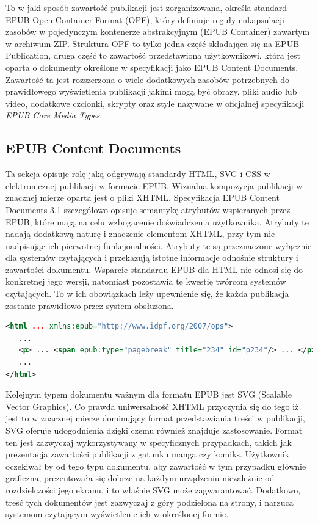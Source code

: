 To w jaki sposób zawartość publikacji jest zorganizowana, określa standard EPUB Open Container Format (OPF), który definiuje reguły enkapsulacji zasobów w pojedynczym kontenerze abstrakcyjnym (EPUB Container) zawartym w archiwum ZIP. Struktura OPF to tylko jedna część składająca się na EPUB Publication, druga część to zawartość przedstawiona użytkownikowi, która jest oparta o dokumenty określone w specyfikacji jako EPUB Content Documents. Zawartość ta jest rozszerzona o wiele dodatkowych zasobów potrzebnych do prawidłowego wyświetlenia publikacji jakimi mogą być obrazy, pliki audio lub video, dodatkowe czcionki, skrypty oraz style nazywane w oficjalnej specyfikacji \textit{EPUB Core Media Types}.

\subsection{EPUB Content Documents}

Ta sekcja opisuje rolę jaką odgrywają standardy HTML, SVG i CSS w elektronicznej publikacji w formacie EPUB. Wizualna kompozycja publikacji w znacznej mierze oparta jest o pliki XHTML. Specyfikacja EPUB Content Documents 3.1 szczegółowo opisuje semantykę atrybutów wspieranych przez EPUB, które mają na celu wzbogacenie doświadczenia użytkownika. Atrybuty te nadają dodatkową naturę i znaczenie elementom XHTML, przy tym nie nadpisując ich pierwotnej funkcjonalności. Atrybuty te są przeznaczone wyłącznie dla systemów czytających i przekazują istotne informacje odnośnie struktury i zawartości dokumentu. Wsparcie standardu EPUB dla HTML nie odnosi się do konkretnej jego wersji, natomiast pozostawia tę kwestię twórcom systemów czytających. To w ich obowiązkach leży upewnienie się, że każda publikacja zostanie prawidłowo przez system obsłużona.

\begin{lstlisting}[float=h, caption={Przykładowe wykorzystanie atrybutu epub:type aby oznaczyć zakończenie linii.\protect\cite{EPUBContentDocumentsSpecificationXML}}, language=XML, label=abcde]
<html ... xmlns:epub="http://www.idpf.org/2007/ops">
   ...
   <p> ... <span epub:type="pagebreak" title="234" id="p234"/> ... </p>
   ...
</html>
\end{lstlisting}

Kolejnym typem dokumentu ważnym dla formatu EPUB jest SVG (Scalable Vector Graphics). Co prawda uniwersalność XHTML przyczynia się do tego iż jest to w znacznej mierze dominujący format przedstawiania treści w publikacji, SVG oferuje udogodnienia dzięki czemu również znajduje zastosowanie. Format ten jest zazwyczaj wykorzystywany w specyficznych przypadkach, takich jak prezentacja zawartości publikacji z gatunku manga czy komiks. Użytkownik oczekiwał by od tego typu dokumentu, aby zawartość w tym przypadku głównie graficzna, prezentowała się dobrze na każdym urządzeniu niezależnie od rozdzielczości jego ekranu, i to właśnie SVG może zagwarantować. Dodatkowo, treść tych dokumentów jest zazwyczaj z góry podzielona na strony, i narzuca systemom czytającym wyświetlenie ich w określonej formie.

